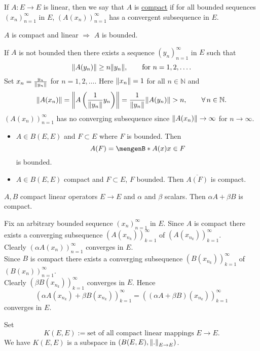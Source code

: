
\begin{definition}[compact]
	If $A: E \to E$ is linear, then we say that $A$ is \underline{compact} if for all bounded sequences $(x_n)_{n=1}^{\infty}$ in $E$, $ (A(x_n))_{n=1}^{\infty}$ has a convergent subsequence in $E$.
\end{definition}

\begin{lemma}
	$A$ is compact and linear \qquad  $\Rightarrow $ \qquad  $A$ is bounded.
\end{lemma}
\begin{beweis}
	If $A$ is not bounded then there exists a sequence $(y_n)_{n=1}^{\infty}$ in $E$ such that
	\[
		\norm{A(y_n)} \geq n \norm{y_n}, \qquad \text{for }n=1,2,\dots.
	\]
	Set $x_n = \frac{y_n}{\norm{y_n}}$ for $n = 1,2,\dots$. Here $\norm{x_n}=1$ for all $n \in \mathbb{N}$ and 
	\[
		\norm{A(x_n)} = \norm{A \left( \frac{1}{\norm{y_n}}y_n \right)} = \frac{1}{\norm{y_n}} \norm{A(y_n)} >n, \qquad \forall\, n \in \mathbb{N}.
	\]
	$(A(x_n))_{n=1}^{\infty}$ has no converging subsequence since $\norm{A(x_n)} \to \infty$ for $n \to \infty$.
\end{beweis}
\begin{bemerkung}
	\begin{itemize}
		\item $A \in B(E,E)$ and $F \subset E$ where $F$ is bounded. Then
		\[
			A(F) = \set[A(x)]{x \in F} 
		\]
		is bounded.
		\item $A \in B(E,E)$ compact and $F \subset E$, $F$ bounded. Then $\overline{A(F)}$ is compact.
	\end{itemize}
\end{bemerkung}

\begin{lemma}
	$A,B$ compact linear operators $E \to E$ and $\alpha$ and $\beta$ scalars. Then $\alpha A+ \beta B$ is compact.
\end{lemma}
\begin{beweis}
	Fix an arbitrary bounded sequence $(x_n)_{n=1}^{\infty}$ in $E$. Since $A$ is compact there exists a converging subsequence $(A(x_{n_k}))_{k=1}^{\infty}$ of $(A(x _{n_k}))_{k=1}^{\infty}$. \\ Clearly $(\alpha A(x_n))_{n=1}^{\infty}$ converges in $E$. \\ Since $B$ is compact there exists a converging subsequence $(B(x_{n_k}))_{k=1}^{\infty}$ of $(B(x_n))_{n=1}^{\infty}$.  \\ Clearly $(\beta B(x_{n_k}))_{k=1}^{\infty}$ converges in $E$. Hence
	\[
		\left( \alpha A(x _{n_k}) + \beta B(x _{n_k}) \right)_{k=1}^{\infty} = \left( (\alpha A + \beta B)(x _{n_k}) \right)_{k=1}^{\infty}
	\]
	converges in $E$.
\end{beweis} 
Set \[
	K(E,E) := \text{set of all compact linear mappings $E \to E$}.
\]
We have $K(E,E)$ is a subspace in $(B(E,E), \norm{.}_{E \to E})$.

